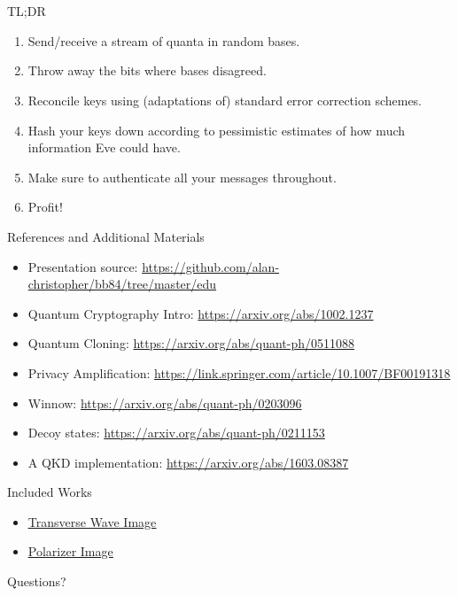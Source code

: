 \documentclass[pdf]{beamer}
\makeatletter
\def\beamer@writeslidentry@miniframesoff{%
  \expandafter\beamer@ifempty\expandafter{\beamer@framestartpage}{}%
  {%
    \clearpage\beamer@notesactions%
  }
}
\newcommand*{\miniframesoff}{\let\beamer@writeslidentry=\beamer@writeslidentry@miniframesoff}
\makeatother
\begin{document}
\miniframesoff
\section*{}
\begin{frame}{TL;DR}
  \begin{enumerate}
  \item Send/receive a stream of quanta in random bases.
  \item Throw away the bits where bases disagreed.
  \item Reconcile keys using (adaptations of) standard error correction schemes.
  \item Hash your keys down according to pessimistic estimates of how much
    information Eve could have.
  \item Make sure to authenticate all your messages throughout.
  \item Profit!
  \end{enumerate}
\end{frame}

\begin{frame}{References and Additional Materials}
  \begin{itemize}
  \item Presentation source:
    \url{https://github.com/alan-christopher/bb84/tree/master/edu}
  \item Quantum Cryptography Intro: \url{https://arxiv.org/abs/1002.1237}
  \item Quantum Cloning: \url{https://arxiv.org/abs/quant-ph/0511088}
  \item Privacy Amplification: \url{https://link.springer.com/article/10.1007/BF00191318}
  \item Winnow: \url{https://arxiv.org/abs/quant-ph/0203096}
  \item Decoy states: \url{https://arxiv.org/abs/quant-ph/0211153} %
  \item A QKD implementation: \url{https://arxiv.org/abs/1603.08387}
  \end{itemize}
\end{frame}

\begin{frame}{Included Works}
  \begin{itemize}
  \item \underline{\href{https://commons.wikimedia.org/wiki/File:\%D0\%93\%D0\%B5\%D0\%BD\%D0\%B5\%D1\%80\%D0\%B0\%D1\%86\%D0\%B8\%D1\%8F_\%D1\%8D\%D0\%BB\%D0\%B5\%D0\%BA\%D1\%82\%D1\%80\%D0\%BE\%D0\%BC\%D0\%B0\%D0\%B3\%D0\%BD\%D0\%B8\%D0\%BD\%D0\%BE\%D0\%B9_\%D0\%B2\%D0\%BE\%D0\%BB\%D0\%BD\%D1\%8B.jpg}{Transverse Wave Image}}
  \item \underline{\href{https://commons.wikimedia.org/wiki/File:Loi_de_malus.png}{Polarizer Image}}
  \end{itemize}
\end{frame}

\begin{frame}{Questions?}
\end{frame}
\end{document}
